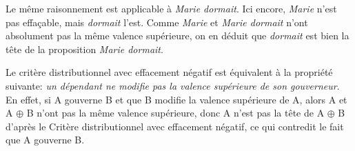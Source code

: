 Le même raisonnement est applicable à \textit{Marie dormait}. Ici encore, \textit{Marie} n’est pas effaçable, mais \textit{dormait} l’est. Comme \textit{Marie} et \textit{Marie dormait} n’ont absolument pas la même valence supérieure, on en déduit que \textit{dormait} est bien la tête de la proposition \textit{Marie dormait}.

Le critère distributionnel avec effacement négatif est équivalent à la propriété suivante: \textit{un dépendant ne modifie pas la valence supérieure de son gouverneur}. En effet, si A gouverne B et que B modifie la valence supérieure de A, alors A et A $\oplus$ B n'ont pas la même valence supérieure, donc A n'est pas la tête de A $\oplus$ B d'après le Critère distributionnel avec effacement négatif, ce qui contredit le fait que A gouverne B.\largerpage[2]

